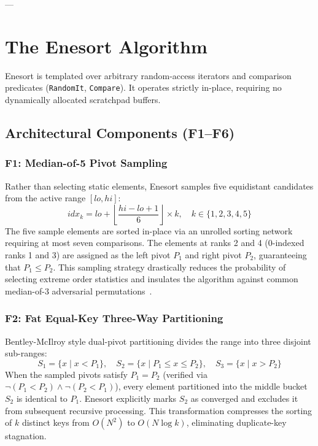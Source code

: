 \documentclass[journal]{IEEEtran}
\begin{document}
---

\section{The Enesort Algorithm}

Enesort is templated over arbitrary random-access iterators and comparison predicates (\texttt{RandomIt}, \texttt{Compare}). It operates strictly in-place, requiring no dynamically allocated scratchpad buffers.

\subsection{Architectural Components (F1--F6)}

\subsubsection{F1: Median-of-5 Pivot Sampling}
Rather than selecting static elements, Enesort samples five equidistant candidates from the active range $[lo, hi]$:
\begin{equation}
    idx_k = lo + \left\lfloor \frac{hi - lo + 1}{6} \right\rfloor \times k, \quad k \in \{1, 2, 3, 4, 5\}
\end{equation}
The five sample elements are sorted in-place via an unrolled sorting network requiring at most seven comparisons. The elements at ranks 2 and 4 (0-indexed ranks 1 and 3) are assigned as the left pivot $P_1$ and right pivot $P_2$, guaranteeing that $P_1 \le P_2$. This sampling strategy drastically reduces the probability of selecting extreme order statistics and insulates the algorithm against common median-of-3 adversarial permutations~\cite{mcilroy1999killer}.

\subsubsection{F2: Fat Equal-Key Three-Way Partitioning}
Bentley-McIlroy style dual-pivot partitioning divides the range into three disjoint sub-ranges:
\begin{equation}
    S_1 = \{x \mid x < P_1\}, \quad S_2 = \{x \mid P_1 \le x \le P_2\}, \quad S_3 = \{x \mid x > P_2\}
\end{equation}
When the sampled pivots satisfy $P_1 = P_2$ (verified via $\neg(P_1 < P_2) \wedge \neg(P_2 < P_1)$), every element partitioned into the middle bucket $S_2$ is identical to $P_1$. Enesort explicitly marks $S_2$ as converged and excludes it from subsequent recursive processing. This transformation compresses the sorting of $k$ distinct keys from $O(N^2)$ to $O(N \log k)$, eliminating duplicate-key stagnation.
\end{document}

